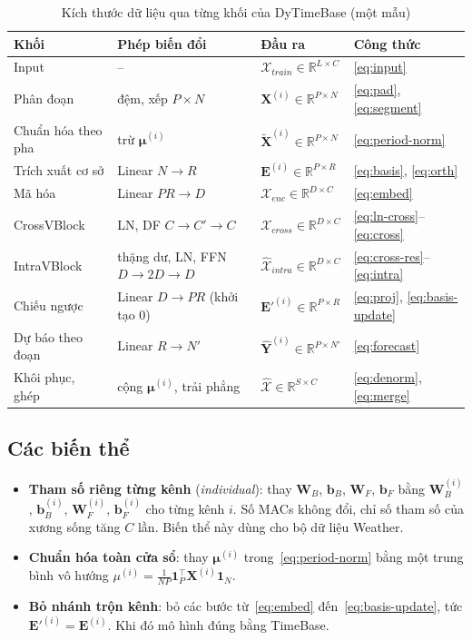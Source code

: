 \documentclass[12pt,a4paper]{report}
\numberwithin{equation}{chapter}
\newcommand{\R}{\mathbb{R}}
\newcommand{\one}{\mathbf{1}}
\begin{document}
\begin{table}[ht]
\centering
\caption{Kích thước dữ liệu qua từng khối của DyTimeBase (một mẫu)}
\label{tab:shapes}
\small
\begin{tabular}{@{}llll@{}}
\toprule
Khối & Phép biến đổi & Đầu ra & Công thức\\
\midrule
Input & -- & $\mathcal{X}_{train}\in\R^{L\times C}$ & \eqref{eq:input}\\
Phân đoạn & đệm, xếp $P\times N$ & $\mathbf{X}^{(i)}\in\R^{P\times N}$ & \eqref{eq:pad}, \eqref{eq:segment}\\
Chuẩn hóa theo pha & trừ $\bm{\mu}^{(i)}$ & $\tilde{\mathbf{X}}^{(i)}\in\R^{P\times N}$ & \eqref{eq:period-norm}\\
Trích xuất cơ sở & Linear $N\to R$ & $\mathbf{E}^{(i)}\in\R^{P\times R}$ & \eqref{eq:basis}, \eqref{eq:orth}\\
Mã hóa & Linear $PR\to D$ & $\mathcal{X}_{enc}\in\R^{D\times C}$ & \eqref{eq:embed}\\
CrossVBlock & LN, DF $C\to C'\to C$ & $\mathcal{X}_{cross}\in\R^{D\times C}$ & \eqref{eq:ln-cross}--\eqref{eq:cross}\\
IntraVBlock & thặng dư, LN, FFN $D\to 2D\to D$ & $\hat{\mathcal{X}}_{intra}\in\R^{D\times C}$ & \eqref{eq:cross-res}--\eqref{eq:intra}\\
Chiếu ngược & Linear $D\to PR$ (khởi tạo 0) & $\mathbf{E}'^{(i)}\in\R^{P\times R}$ & \eqref{eq:proj}, \eqref{eq:basis-update}\\
Dự báo theo đoạn & Linear $R\to N'$ & $\hat{\mathbf{Y}}^{(i)}\in\R^{P\times N'}$ & \eqref{eq:forecast}\\
Khôi phục, ghép & cộng $\bm{\mu}^{(i)}$, trải phẳng & $\hat{\mathcal{X}}\in\R^{S\times C}$ & \eqref{eq:denorm}, \eqref{eq:merge}\\
\bottomrule
\end{tabular}
\end{table}

\subsection{Các biến thể}

\begin{itemize}
  \item \textbf{Tham số riêng từng kênh} (\emph{individual}): thay $\mathbf{W}_B$, $\mathbf{b}_B$, $\mathbf{W}_F$, $\mathbf{b}_F$
        bằng $\mathbf{W}^{(i)}_B$, $\mathbf{b}^{(i)}_B$, $\mathbf{W}^{(i)}_F$, $\mathbf{b}^{(i)}_F$ cho từng kênh $i$. Số MACs
        không đổi, chỉ số tham số của xương sống tăng $C$ lần. Biến thể này dùng cho bộ dữ liệu Weather.
  \item \textbf{Chuẩn hóa toàn cửa sổ}: thay $\bm{\mu}^{(i)}$ trong~\eqref{eq:period-norm} bằng một trung bình vô hướng
        $\mu^{(i)}=\frac{1}{NP}\one_P^{\top}\mathbf{X}^{(i)}\one_N$.
  \item \textbf{Bỏ nhánh trộn kênh}: bỏ các bước từ~\eqref{eq:embed} đến~\eqref{eq:basis-update}, tức
        $\mathbf{E}'^{(i)}=\mathbf{E}^{(i)}$. Khi đó mô hình đúng bằng TimeBase.
\end{itemize}
\end{document}
